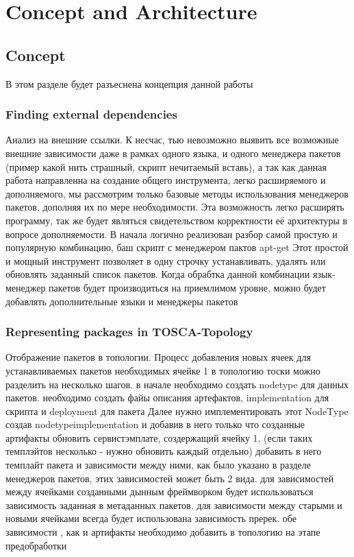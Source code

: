 
\chapter{Concept and Architecture}\label{chap:conarch}
\section{Concept}
В этом разделе будет разъеснена концепция данной работы

\fi
\subsection*{Finding external dependencies}
Анализ на внешние ссылки. 
К несчас, тью невозможно выявить все возможные внешние зависимости даже в рамках одного языка, и одного менеджера пакетов (пример какой нить страшный, скрипт нечитаемый вставь), а так как данная работа направленна на создание общего инструмента, легко расширяемого и дополняемого, мы рассмотрим только базовые методы использования менеджеров пакетов, дополняя их по мере необходимости. Эта возможность легко расширять программу, так же будет являться свидетельством корректности её архитектуры в вопросе дополняемости.
В начала логично реализован разбор самой простую и популярную комбинацию, баш скрипт с менеджером пактов apt-get 
Этот простой и мощный инструмент позволяет в одну строчку устанавливать, удалять или обновлять заданный список пакетов.
Когда обрабтка данной комбинации язык-менеджер пакетов будет производиться на приемлимом уровне, можно будет добавлять дополнительные языки и менеджеры пакетов

\fi
\subsection*{Representing packages in TOSCA-Topology}
Отображение пакетов в топологии. Процесс добавления новых ячеек для устанавливаемых пакетов необходимых ячейке 1 в топологию тоски можно разделить на несколько шагов. 
в начале необходимо создать nodetype для данных пакетов. 
необходимо создать файы описания артефактов, implementation для скрипта и deployment для пакета
Далее нужно имплементировать этот NodeType  создав nodetypeimplementation и добавив в него только что созданные артифакты
обновить сервистэмплате, создержащий ячейку 1, (если таких темплэйтов несколько - нужно обновить каждый отдельно)
добавить в него темплайт пакета и зависимости между ними, как было указано в разделе менеджеров пакетов, этих зависимостей может быть 2 вида. 
для зависимостей между ячейками созданными дынным фреймворком будет использоваться зависимость заданная в метаданных пакетов.
для зависимости между старыми и новыми ячейками всегда будет использована зависимость пререк.
обе зависимости , как и артифакты необходимо добавить в топологию на этапе предобработки

